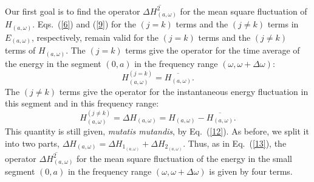 \documentclass[12pt]{elsart}
\begin{document}
Our first goal is to find the operator $\overline{\Delta H_{(a, \omega)}^2}$ for the mean square fluctuation of $H_{(a, \omega)}$. Eqs.\ (\ref{6}) and (\ref{9}) for the $(j=k)$ terms and the $(j \neq k)$ terms in $E_{(a, \omega)}$, respectively, remain valid for the $(j=k)$ terms and the $(j \neq k)$ terms of $H_{(a, \omega)}$. The $(j=k)$ terms give the operator for the time average of the energy in the segment $(0, a)$  in the frequency range $(\omega, \omega + \Delta \omega)$:
\begin{equation}
H_{(a, \omega)}^{(j=k)} = \overline{H_{(a, \omega)}}.
\label{q6a}
\end{equation}
The $(j \neq k)$ terms  give the operator for the instantaneous energy fluctuation in this segment and in this frequency range:
\begin{equation}
H_{(a, \omega)}^{(j \neq k)} = \Delta H_{(a, \omega)} =  H_{(a, \omega)} - \overline{H_{(a, \omega)}}.
\label{q7}
\end{equation}
This quantity is still given, {\it mutatis mutandis}, by Eq.\ (\ref{12}). As before, we split it into two parts, $\Delta H_{(a, \omega)} = \Delta H_{1_{(a, \omega)}} + \Delta H_{2_{(a, \omega)}}$. Thus, as in Eq.\ (\ref{13}), the operator $\overline{\Delta H_{(a, \omega)}^2}$ for the mean square fluctuation of the energy in the small segment $(0, a)$ in the frequency range $(\omega, \omega + \Delta \omega)$ is given by four terms.
\end{document}
